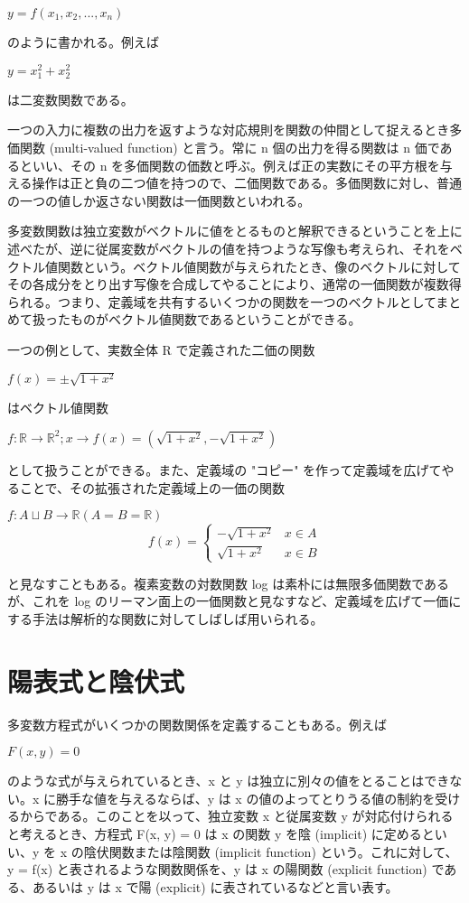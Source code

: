 \documentclass[a4j,12pt]{jreport}
\begin{document}
$y = f(x_1,x_2,...,x_n)$

のように書かれる。例えば

$y = x_1^2 + x_2^2$

は二変数関数である。

一つの入力に複数の出力を返すような対応規則を関数の仲間として捉えるとき多価関数 (multi-valued function) と言う。常に n 個の出力を得る関数は n 価であるといい、その n を多価関数の価数と呼ぶ。例えば正の実数にその平方根を与える操作は正と負の二つ値を持つので、二価関数である。多価関数に対し、普通の一つの値しか返さない関数は一価関数といわれる。

多変数関数は独立変数がベクトルに値をとるものと解釈できるということを上に述べたが、逆に従属変数がベクトルの値を持つような写像も考えられ、それをベクトル値関数という。ベクトル値関数が与えられたとき、像のベクトルに対してその各成分をとり出す写像を合成してやることにより、通常の一価関数が複数得られる。つまり、定義域を共有するいくつかの関数を一つのベクトルとしてまとめて扱ったものがベクトル値関数であるということができる。

一つの例として、実数全体 R で定義された二価の関数

$f(x) = \pm\sqrt{1+x^2}$

はベクトル値関数

$f:\mathbb{R} \to \mathbb{R}^2; x \to f(x) = ( \sqrt{1+x^2},-\sqrt{1+x^2})$

として扱うことができる。また、定義域の "コピー" を作って定義域を広げてやることで、その拡張された定義域上の一価の関数

$f:A \sqcup B \to \mathbb{R} (A = B = \mathbb{R})$
$$
f(x) = \begin{cases}
-\sqrt{1+x^2} & x \in A \\
\sqrt{1+x^2} & x \in B
\end{cases}
$$

と見なすこともある。複素変数の対数関数 log は素朴には無限多価関数であるが、これを log のリーマン面上の一価関数と見なすなど、定義域を広げて一価にする手法は解析的な関数に対してしばしば用いられる。



\section{陽表式と陰伏式}
多変数方程式がいくつかの関数関係を定義することもある。例えば

$F(x,y)=0$

のような式が与えられているとき、x と y は独立に別々の値をとることはできない。x に勝手な値を与えるならば、y は x の値のよってとりうる値の制約を受けるからである。このことを以って、独立変数 x と従属変数 y が対応付けられると考えるとき、方程式 F(x, y) = 0 は x の関数 y を陰 (implicit) に定めるといい、y を x の陰伏関数または陰関数 (implicit function) という。これに対して、y = f(x) と表されるような関数関係を、y は x の陽関数 (explicit function) である、あるいは y は x で陽 (explicit) に表されているなどと言い表す。
\end{document}
